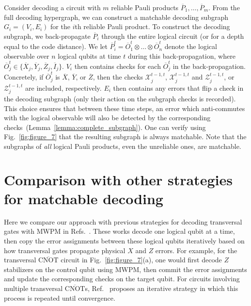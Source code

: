 \documentclass[prx,twocolumn,secnumarabic,balancelastpage,amsmath,amssymb,longbibliography]{revtex4-2}
\newcommand{\lop}[1]{\overline{#1}}
\newcommand{\lcnot}{\overline{\text{CNOT}}}
\begin{document}
Consider decoding a circuit with $m$ reliable Pauli products $\lop P_1, \dots, \lop P_m$.
From the full decoding hypergraph, we can construct a matchable decoding subgraph \mbox{$G_i = (V_i, E_i)$} for the $i$th reliable Pauli product.
%
To construct the decoding subgraph, we back-propagate $\lop P_i$ through the entire logical circuit (or for a depth equal to the code distance). 
%
We let $\lop P^t_i = \lop O_1^t \otimes \dots \otimes \lop O_n^t$ denote the logical observable over $n$ logical qubits at time $t$ during this back-propagation, where $\lop O_j^t \in \{\lop X_j, \lop Y_j, \lop Z_j, \lop I_j\}$. 
%
$V_i$ then contains checks for each $\lop O^t_j$ in the back-propagation.
%
Concretely, if $\lop O_j^t$ is $\lop X$, $\lop Y$, or $\lop Z$, then the checks  $\mathcal{X}_j^{t-1, t}$, $\mathcal{X}_j^{t-1, t}$ and $\mathcal{Z}_j^{t-1, t}$, or $\mathcal{Z}_j^{t-1, t}$ are included, respectively. 
%
$E_i$ then contains any errors that flip a check in the decoding subgraph (only their action on the subgraph checks is recorded).
%
This choice ensures that between these time steps, an error which anti-commutes with the logical observable will also be detected by the corresponding checks~(Lemma~\ref{lemma:complete_subgraph}).
%
One can verify using Fig.~\ref{fig:figure_7} that the resulting subgraph is always matchable.
%
Note that the subgraphs of \textit{all} logical Pauli products, even the unreliable ones, are matchable.

\section{Comparison with other strategies for matchable decoding\label{appendix:other_strategy}}

Here we compare our approach with previous strategies for decoding transversal gates with MWPM in Refs.~\cite{wan2024iterative,sahay2024error,beverland2021cost}.
%
These works decode one logical qubit at a time, then copy the error assignments between these logical qubits iteratively based on how transversal gates propagate physical $X$ and $Z$ errors.
%
For example, for the transversal $\lcnot$ circuit in Fig.~\ref{fig:figure_7}(a), one would first decode $Z$ stabilizers on the control qubit using MWPM, then commit the error assignments and update the corresponding checks on the target qubit.
%
For circuits involving multiple transversal $\lcnot$s, Ref.~\cite{wan2024iterative} proposes an iterative strategy in which this process is repeated until convergence.
\end{document}
